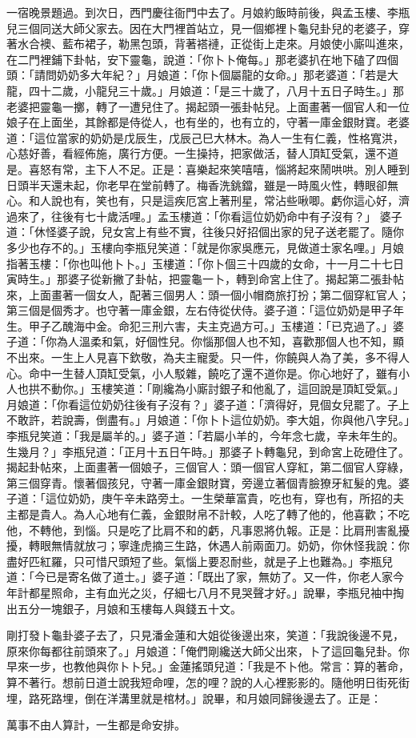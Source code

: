 一宿晚景題過。到次日，西門慶往衙門中去了。月娘約飯時前後，與孟玉樓、李瓶兒三個同送大師父家去。因在大門裡首站立，見一個鄉裡卜龜兒卦兒的老婆子，穿著水合襖、藍布裙子，勒黑包頭，背著褡褳，正從街上走來。月娘使小廝叫進來，在二門裡鋪下卦帖，安下靈龜，說道：「你卜卜俺每。」那老婆扒在地下磕了四個頭：「請問奶奶多大年紀？」月娘道：「你卜個屬龍的女命。」那老婆道：「若是大龍，四十二歲，小龍兒三十歲。」月娘道：「是三十歲了，八月十五日子時生。」那老婆把靈龜一擲，轉了一遭兒住了。揭起頭一張卦帖兒。上面畫著一個官人和一位娘子在上面坐，其餘都是侍從人，也有坐的，也有立的，守著一庫金銀財寶。老婆道：「這位當家的奶奶是戊辰生，戊辰己巳大林木。為人一生有仁義，性格寬洪，心慈好善，看經佈施，廣行方便。一生操持，把家做活，替人頂缸受氣，還不道是。喜怒有常，主下人不足。正是：喜樂起來笑嘻嘻，惱將起來鬧哄哄。別人睡到日頭半天還未起，你老早在堂前轉了。梅香洗銚鐺，雖是一時風火性，轉眼卻無心。和人說也有，笑也有，只是這疾厄宮上著刑星，常沾些啾唧。虧你這心好，濟過來了，往後有七十歲活哩。」孟玉樓道：「你看這位奶奶命中有子沒有？」 婆子道：「休怪婆子說，兒女宮上有些不實，往後只好招個出家的兒子送老罷了。隨你多少也存不的。」玉樓向李瓶兒笑道：「就是你家吳應元，見做道士家名哩。」月娘指著玉樓：「你也叫他卜卜。」玉樓道：「你卜個三十四歲的女命，十一月二十七日寅時生。」那婆子從新撇了卦帖，把靈龜一卜，轉到命宮上住了。揭起第二張卦帖來，上面畫著一個女人，配著三個男人：頭一個小帽商旅打扮；第二個穿紅官人；第三個是個秀才。也守著一庫金銀，左右侍從伏侍。婆子道：「這位奶奶是甲子年生。甲子乙醜海中金。命犯三刑六害，夫主克過方可。」玉樓道：「已克過了。」婆子道：「你為人溫柔和氣，好個性兒。你惱那個人也不知，喜歡那個人也不知，顯不出來。一生上人見喜下欽敬，為夫主寵愛。只一件，你饒與人為了美，多不得人心。命中一生替人頂缸受氣，小人駁雜，饒吃了還不道你是。你心地好了，雖有小人也拱不動你。」玉樓笑道：「剛纔為小廝討銀子和他亂了，這回說是頂缸受氣。」月娘道：「你看這位奶奶往後有子沒有？」婆子道：「濟得好，見個女兒罷了。子上不敢許，若說壽，倒盡有。」月娘道：「你卜卜這位奶奶。李大姐，你與他八字兒。」李瓶兒笑道：「我是屬羊的。」婆子道：「若屬小羊的，今年念七歲，辛未年生的。生幾月？」李瓶兒道：「正月十五日午時。」那婆子卜轉龜兒，到命宮上矻磴住了。揭起卦帖來，上面畫著一個娘子，三個官人：頭一個官人穿紅，第二個官人穿綠，第三個穿青。懷著個孩兒，守著一庫金銀財寶，旁邊立著個青臉獠牙紅髮的鬼。婆子道：「這位奶奶，庚午辛未路旁土。一生榮華富貴，吃也有，穿也有，所招的夫主都是貴人。為人心地有仁義，金銀財帛不計較，人吃了轉了他的，他喜歡；不吃他，不轉他，到惱。只是吃了比肩不和的虧，凡事恩將仇報。正是：比肩刑害亂擾擾，轉眼無情就放刁；寧逢虎摘三生路，休遇人前兩面刀。奶奶，你休怪我說：你盡好匹紅羅，只可惜尺頭短了些。氣惱上要忍耐些，就是子上也難為。」李瓶兒道：「今已是寄名做了道士。」婆子道：「既出了家，無妨了。又一件，你老人家今年計都星照命，主有血光之災，仔細七八月不見哭聲才好。」說畢，李瓶兒袖中掏出五分一塊銀子，月娘和玉樓每人與錢五十文。

剛打發卜龜卦婆子去了，只見潘金蓮和大姐從後邊出來，笑道：「我說後邊不見，原來你每都往前頭來了。」月娘道：「俺們剛纔送大師父出來，卜了這回龜兒卦。你早來一步，也教他與你卜卜兒。」金蓮搖頭兒道：「我是不卜他。常言：算的著命，算不著行。想前日道士說我短命哩，怎的哩？說的人心裡影影的。隨他明日街死街埋，路死路埋，倒在洋溝里就是棺材。」說畢，和月娘同歸後邊去了。正是：

萬事不由人算計，一生都是命安排。

